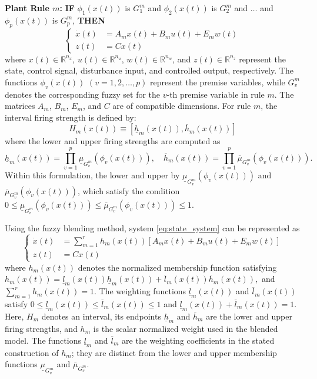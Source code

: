 \documentclass[preprint,review,fleqn,sort&compress,3p]{elsarticle}
\theoremstyle{definition} %
\theoremstyle{definition}%
\newif\ifreviewmarkup
\DeclareRobustCommand{\revdel}[1]{\ifreviewmarkup{\color{revisionred}\hypersetup{linkcolor=revisionred,citecolor=revisionred}#1}\fi}
\DeclareRobustCommand{\revadd}[1]{{\ifreviewmarkup\color{revisiongreen}\hypersetup{linkcolor=revisiongreen,citecolor=revisiongreen}\fi#1}}
\begin{document}
\textbf{Plant Rule $m$:} 
\textbf{IF} $\phi_1(x(t))$ is $G^{m}_1$ and $\phi_2(x(t))$ is $G^{m}_2$ and $\ldots$ and $\phi_p(x(t))$ is $G^{m}_p$, \textbf{THEN}
\begin{equation}\label{eq:state_system}
	\left\{
	\begin{aligned}
		\dot{x}(t) &= A_{m} x(t) + B_{m} u(t) + E_{m} w(t) \\
		z(t) &= C x(t)
	\end{aligned}
	\right.
\end{equation}
where $x(t)\in\mathbb{R}^{n_x}$, $u(t)\in\mathbb{R}^{n_u}$,
$w(t)\in\mathbb{R}^{n_w}$, and $z(t)\in\mathbb{R}^{n_z}$
represent the state, control signal, disturbance input, and controlled output, respectively.
The functions $\phi_v(x(t))$ $(v=1,2,\ldots,p)$ represent the premise variables, while $G_v^m$ denotes the corresponding fuzzy set for the $v$-th premise variable in rule $m$.
The matrices $A_m$, $B_m$, $E_m$, and $C$ are of compatible dimensions.
For rule $m$, the interval firing strength is defined by:
\begin{equation}
	H_m(x(t)) \equiv \left[ \underline{h}_m(x(t)), \overline{h}_m(x(t)) \right]
\end{equation} 
where the lower and upper firing strengths are computed as
\begin{equation}
	\underline{h}_m(x(t)) = \prod_{v=1}^{p} \underline{\mu}_{G^m_{v}}(\phi_v(x(t))),
	\quad
	\overline{h}_m(x(t)) = \prod_{v=1}^{p} \overline{\mu}_{G^m_{v}}(\phi_v(x(t))).
\end{equation}
\label{rev:M14}Within this formulation, the lower and upper \revdel{MFs are denoted} by $\underline{\mu}_{G^m_{v}}(\phi_v(x(t)))$ and $\overline{\mu}_{G^m_{v}}(\phi_v(x(t)))$, which satisfy the condition $0 \le \underline{\mu}_{G^m_{v}}(\phi_v(x(t))) \le \overline{\mu}_{G^m_{v}}(\phi_v(x(t))) \le 1$.

Using the fuzzy blending method, system \eqref{eq:state_system} can be represented as
\begin{equation}
	\label{eq:global_system}
	\left\{
	\begin{aligned}
		\dot{x}(t) &= \sum_{m=1}^{r} h_m(x(t))
		\left[ 
		A_{m} x(t) + B_{m} u(t) + E_{m} w(t)
		\right]  \\
		z(t) &= C x(t)
	\end{aligned}
	\right.
\end{equation}
where $h_m(x(t))$ denotes the normalized membership function satisfying
$
h_m(x(t))
=
\underline{l}_m(x(t))\underline{h}_m(x(t))
+
\overline{l}_m(x(t))\overline{h}_m(x(t)),
$
and
$\sum_{m=1}^{r}h_m(x(t))=1$.
The weighting functions $\underline{l}_m(x(t))$ and
$\overline{l}_m(x(t))$ satisfy
$0\leq\underline{l}_m(x(t))
\leq\overline{l}_m(x(t))\leq1$
and
$\underline{l}_m(x(t))+\overline{l}_m(x(t))=1$.
\label{rev:M15}\revadd{Here, $H_m$ denotes an interval, its endpoints $\underline h_m$ and $\overline h_m$ are the lower and upper firing strengths, and $h_m$ is the scalar normalized weight used in the blended model. The functions $\underline l_m$ and $\overline l_m$ are the weighting coefficients in the stated construction of $h_m$; they are distinct from the lower and upper membership functions $\underline\mu_{G_v^m}$ and $\overline\mu_{G_v^m}$.}
\end{document}
